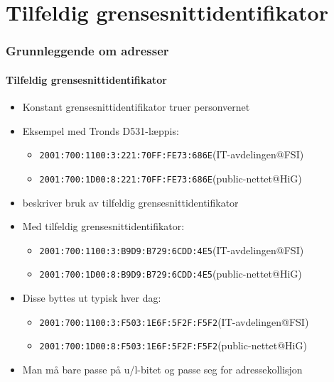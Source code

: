 \section{Tilfeldig grensesnittidentifikator}
\begin{frame}%
  \frametitle{Grunnleggende om adresser}
  \framesubtitle{Tilfeldig grensesnittidentifikator}
  \pause
  \begin{itemize}[<+->]
  \item Konstant grensesnittidentifikator truer personvernet
  \item Eksempel med Tronds D531-læppis:
    \begin{itemize}[<+->]
    \item \texttt{2001:700:1100:3:\alert{221:70FF:FE73:686E}}\hfill(IT-avdelingen@FSI)
    \item \texttt{2001:700:1D00:8:\alert{221:70FF:FE73:686E}}\hfill(public-nettet@HiG)
    \end{itemize}
  \item {} beskriver bruk av tilfeldig grensesnittidentifikator
  \item Med tilfeldig grensesnittidentifikator:
    \begin{itemize}[<+->]
    \item \texttt{2001:700:1100:3:\alert{B9D9:B729:6CDD:4E5}}\hfill(IT-avdelingen@FSI)
    \item \texttt{2001:700:1D00:8:\alert{B9D9:B729:6CDD:4E5}}\hfill(public-nettet@HiG)
    \end{itemize}
  \item Disse byttes ut typisk hver dag:
    \begin{itemize}[<+->]
    \item \texttt{2001:700:1100:3:\alert{F503:1E6F:5F2F:F5F2}}\hfill(IT-avdelingen@FSI)
    \item \texttt{2001:700:1D00:8:\alert{F503:1E6F:5F2F:F5F2}}\hfill(public-nettet@HiG)
    \end{itemize}
  \item Man må bare passe på u/l-bitet og passe seg for adressekollisjon
  \end{itemize}
\end{frame}


